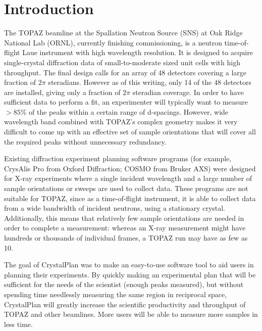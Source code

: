 \documentclass[final]{iucr}              %
\begin{document}
\section{Introduction}

The TOPAZ beamline at the Spallation Neutron Source (SNS) at Oak Ridge National
Lab (ORNL), currently finishing commissioning, is a neutron time-of-flight
Laue instrument with high wavelength resolution. It is designed to acquire
single-crystal diffraction data of small-to-moderate sized unit cells with  high
throughput. The final design calls for an array of 48 detectors covering a large
fraction of $2\pi$ steradians. However as of this writing, only 14 of the 48
detectors are installed, giving only a fraction of $2\pi$ steradian coverage. 
In order to have sufficient data to perform a fit, an experimenter will typically want
to measure $ > 85\%$ of the peaks within a certain range of d-spacings. 
However, wide wavelength band combined with TOPAZ's complex
geometry makes it very difficult to come up with an effective set of sample
orientations that will cover all the required peaks without unnecessary redundancy. 


Existing diffraction experiment planning software programs (for example,
CrysAlis Pro from Oxford Diffraction; COSMO from Bruker AXS) were designed for
X-ray experiments where a single  incident wavelength and a large number of
sample orientations or sweeps are used to collect data. 
These programs are not suitable for TOPAZ, since as a time-of-flight instrument, 
it is able to collect data from a wide bandwidth of
incident neutrons, using a stationary crystal. 
Additionally, this means that relatively few sample orientations are needed in
order to complete a measurement: whereas an X-ray measurement might have
hundreds or thousands of individual frames, a TOPAZ run may have as few as 10. 


The goal of CrystalPlan was to make an easy-to-use software tool to aid users in
planning their experiments. By quickly making an experimental plan that will be
sufficient for the needs of the scientist (enough peaks measured), but without
spending time needlessly measuring the same region in reciprocal space,
CrystalPlan will greatly increase the scientific productivity and throughput of
TOPAZ and other beamlines. More users will be able to measure more samples in
less time.
\end{document}
